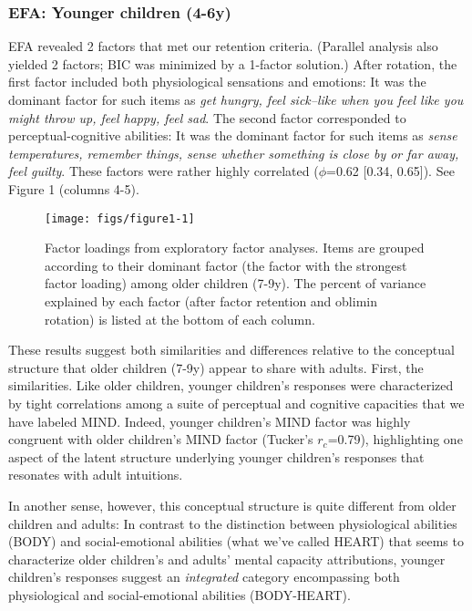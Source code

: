 \documentclass[10pt, letterpaper]{article}
\newenvironment{CodeChunk}{}{}
\begin{document}
\subsubsection{EFA: Younger children
(4-6y)}\label{efa-younger-children-4-6y}

EFA revealed 2 factors that met our retention criteria. (Parallel
analysis also yielded 2 factors; BIC was minimized by a 1-factor
solution.) After rotation, the first factor included both physiological
sensations and emotions: It was the dominant factor for such items as
\emph{get hungry, feel sick--like when you feel like you might throw up,
feel happy, feel sad}. The second factor corresponded to
perceptual-cognitive abilities: It was the dominant factor for such
items as \emph{sense temperatures, remember things, sense whether
something is close by or far away, feel guilty}. These factors were
rather highly correlated (\(\phi\)=0.62 {[}0.34, 0.65{]}). See Figure 1
(columns 4-5).

\begin{CodeChunk}
\begin{figure*}[tb]

{\centering \texttt{[image: figs/figure1-1]} 

}

\caption[Factor loadings from exploratory factor analyses]{Factor loadings from exploratory factor analyses. Items are grouped according to their dominant factor (the factor with the strongest factor loading) among older children (7-9y). The percent of variance explained by each factor (after factor retention and oblimin rotation) is listed at the bottom of each column.}\label{fig:figure1}
\end{figure*}
\end{CodeChunk}

These results suggest both similarities and differences relative to the
conceptual structure that older children (7-9y) appear to share with
adults. First, the similarities. Like older children, younger children's
responses were characterized by tight correlations among a suite of
perceptual and cognitive capacities that we have labeled MIND. Indeed,
younger children's MIND factor was highly congruent with older
children's MIND factor (Tucker's \emph{\(r_c\)}=0.79), highlighting one
aspect of the latent structure underlying younger children's responses
that resonates with adult intuitions.

In another sense, however, this conceptual structure is quite different
from older children and adults: In contrast to the distinction between
physiological abilities (BODY) and social-emotional abilities (what
we've called HEART) that seems to characterize older children's and
adults' mental capacity attributions, younger children's responses
suggest an \emph{integrated} category encompassing both physiological
and social-emotional abilities (BODY-HEART).
\end{document}
